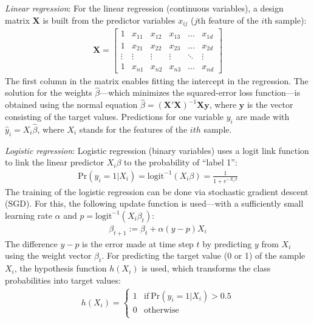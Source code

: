 \documentclass[a4paper]{article}
\begin{document}
\emph{Linear regression}: For the linear regression (continuous
variables), a design matrix $\mathbf{X}$ is built from the predictor
variables $x_{ij}$ ($j$th feature of the $i$th sample):
\begin{align}
\mathbf{X} = 
\begin{bmatrix}
    1 & x_{11} & x_{12} & x_{13} & \dots  & x_{1d} \\
    1 & x_{21} & x_{22} & x_{23} & \dots  & x_{2d} \\
    \vdots & \vdots & \vdots & \vdots & \ddots & \vdots \\
    1 & x_{n1} & x_{n2} & x_{n3} & \dots  & x_{nd}
\end{bmatrix}
\end{align}
The first column in the matrix enables fitting the intercept in the
regression. The solution for the weights $\hat{\beta}$---which
minimizes the squared-error loss function---is obtained using the
normal equation
$\hat{\beta} = (\mathbf{X}'\mathbf{X})^{-1}\mathbf{X}\mathbf{y}$,
where $\mathbf{y}$ is the vector consisting of the target
values. Predictions for one variable $y_i$ are made with
$\hat{y}_i = X_i\hat{\beta}$, where $X_i$ stands for the features of
the $ith$ sample.

\emph{Logistic regression}: Logistic regression (binary variables)
uses a logit link function to link the linear predictor $X_i\beta$ to
the probability of ``label 1'':
\begin{align}
  \text{Pr}(y_i = 1 | X_i) = \text{logit}^{-1}(X_i\beta) = \frac{1}{1 + e^{-X_i\beta}}
\end{align}
The training of the logistic regression can be done via stochastic
gradient descent (SGD). For this, the following update function is
used---with a sufficiently small learning rate $\alpha$ and
$p = \text{logit}^{-1}(X_i\beta_t)$:
\begin{align}
  \beta_{t+1} := \beta_{t} + \alpha (y - p) X_i
\end{align}
The difference $y - p$ is the error made at time step $t$ by predicting
$y$ from $X_i$ using the weight vector $\beta_{t}$.
For predicting the target value (0 or 1) of the sample $X_i$, the
hypothesis function $h(X_i)$ is used, which transforms the class
probabilities into target values:
\begin{align}
h(X_i) = 
\begin{cases}
1 & \text{if}~\text{Pr}(y_i = 1 | X_i) > 0.5\\
0 & \text{otherwise}\\
\end{cases}
\end{align}
\end{document}

